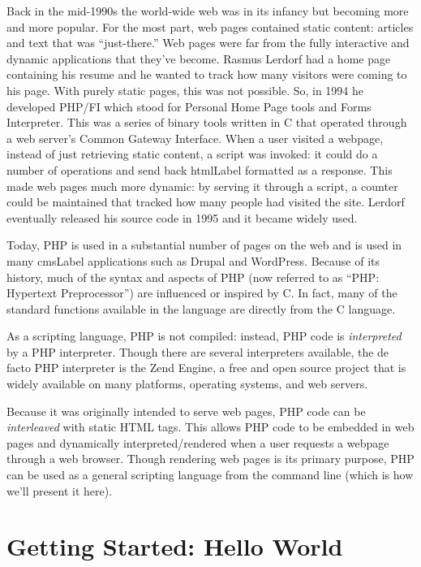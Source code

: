 

Back in the mid-1990s the world-wide web was in its infancy but
becoming more and more popular.  For the most part, web pages
contained static content: articles and text that was ``just-there.''
Web pages were far from the fully interactive and dynamic 
applications that they've become.  Rasmus Lerdorf had a home
page containing his resume and he wanted to track how many
visitors were coming to his page.  With purely static pages, this
was not possible.  So, in 1994 he developed PHP/FI which stood
for Personal Home Page tools and Forms Interpreter.  This was 
a series of binary tools written in C that operated through a 
web server's Common Gateway Interface.  When a user visited
a webpage, instead of just retrieving static content, a script
was invoked: it could do a number of operations and 
send back \gls{htmlLabel} formatted as a response.  This made
web pages much more dynamic: by serving it through a script,
a counter could be maintained that tracked how many people
had visited the site.  Lerdorf eventually released his source
code in 1995 and it became widely used.

Today, PHP is used in a substantial number of pages on the web and
is used in many \gls{cmsLabel} applications such as Drupal and 
WordPress.  Because of its history, much of the syntax and aspects of 
PHP (now referred to as ``PHP: Hypertext Preprocessor'') are 
influenced or inspired by C.  In fact, many of the standard
functions available in the language are directly from the C
language.

As a scripting language, PHP is not compiled: instead, PHP
code is \emph{interpreted} by a PHP interpreter.  Though there
are several interpreters available, the de facto PHP 
interpreter is the Zend Engine, a free and open source
project that is widely available on many platforms, operating
systems, and web servers.

Because it was originally intended to serve web pages, PHP 
code can be \emph{interleaved} with static HTML tags.  This
allows PHP code to be embedded in web pages and dynamically
interpreted/rendered when a user requests a webpage through
a web browser.  Though rendering web pages is its primary 
purpose, PHP can be used as a general scripting language 
from the command line (which is how we'll present it here).

\section{Getting Started: Hello World}

